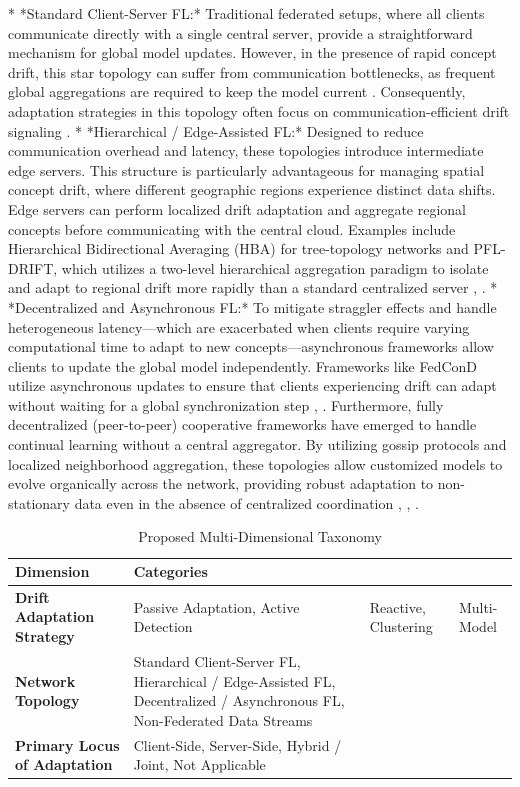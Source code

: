 \documentclass[journal]{IEEEtran}
\begin{document}
*   *Standard Client-Server FL:* Traditional federated setups, where all clients communicate directly with a single central server, provide a straightforward mechanism for global model updates. However, in the presence of rapid concept drift, this star topology can suffer from communication bottlenecks, as frequent global aggregations are required to keep the model current \cite{Abozaid2025}. Consequently, adaptation strategies in this topology often focus on communication-efficient drift signaling \cite{Gutierrez2024}.
*   *Hierarchical / Edge-Assisted FL:* Designed to reduce communication overhead and latency, these topologies introduce intermediate edge servers. This structure is particularly advantageous for managing spatial concept drift, where different geographic regions experience distinct data shifts. Edge servers can perform localized drift adaptation and aggregate regional concepts before communicating with the central cloud. Examples include Hierarchical Bidirectional Averaging (HBA) for tree-topology networks \cite{Hemadasa2025} and PFL-DRIFT, which utilizes a two-level hierarchical aggregation paradigm to isolate and adapt to regional drift more rapidly than a standard centralized server \cite{Aziz2025a}, \cite{Aziz2025}.
*   *Decentralized and Asynchronous FL:* To mitigate straggler effects and handle heterogeneous latency—which are exacerbated when clients require varying computational time to adapt to new concepts—asynchronous frameworks allow clients to update the global model independently. Frameworks like FedConD utilize asynchronous updates to ensure that clients experiencing drift can adapt without waiting for a global synchronization step \cite{Chen2021}, \cite{Chen2021a}. Furthermore, fully decentralized (peer-to-peer) cooperative frameworks have emerged to handle continual learning without a central aggregator. By utilizing gossip protocols and localized neighborhood aggregation, these topologies allow customized models to evolve organically across the network, providing robust adaptation to non-stationary data even in the absence of centralized coordination \cite{Yang2025}, \cite{Lanza2025}, \cite{paper130}.

\begin{table}[!t]
\renewcommand{\arraystretch}{1.3}
\caption{Proposed Multi-Dimensional Taxonomy}
\label{tab:taxonomy}
\centering
\begin{tabular}{p{3cm}p{9cm}}
\toprule
\textbf{Dimension} & \textbf{Categories} \\
\midrule
\textbf{Drift Adaptation Strategy} & Passive Adaptation, Active Detection & Reactive, Clustering & Multi-Model \\
\textbf{Network Topology} & Standard Client-Server FL, Hierarchical / Edge-Assisted FL, Decentralized / Asynchronous FL, Non-Federated Data Streams \\
\textbf{Primary Locus of Adaptation} & Client-Side, Server-Side, Hybrid / Joint, Not Applicable \\
\bottomrule
\end{tabular}
\end{table}
\end{document}

